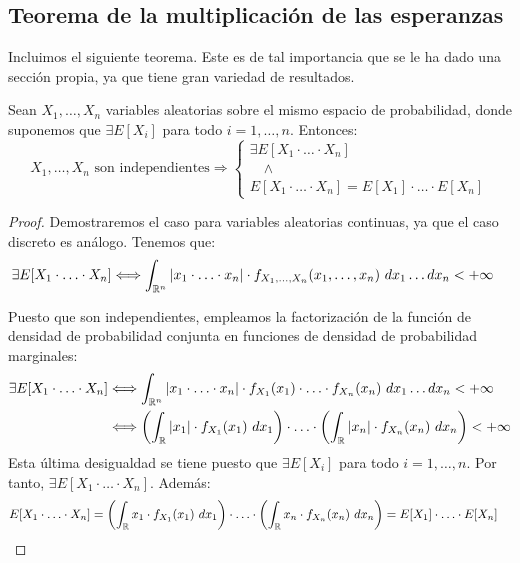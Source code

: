\subsection{Teorema de la multiplicación de las esperanzas}
Incluimos el siguiente teorema. Este es de tal importancia que se le ha dado una sección propia, ya que tiene gran variedad de resultados.
\begin{teo}
    Sean $X_1, \ldots, X_n$ variables aleatorias sobre el mismo espacio de probabilidad, donde suponemos que $\exists E[X_i]$ para todo $i = 1, \ldots, n$. Entonces:
    \begin{equation*}
        X_1, \ldots, X_n \text{ son independientes} \Longrightarrow \left\{
            \begin{array}{l}
                \exists E[X_1 \cdot \ldots \cdot X_n] \\
                \quad \land \\
                E[X_1 \cdot \ldots \cdot X_n] = E[X_1] \cdot \ldots \cdot E[X_n]
            \end{array}
        \right.
    \end{equation*}
\end{teo}
\begin{proof}
    Demostraremos el caso para variables aleatorias continuas, ya que el caso discreto es análogo. Tenemos que:
    \begin{align*}
        \exists E[X_1 \cdot \ldots \cdot X_n] &\Longleftrightarrow \int_{\mathbb{R}^n} |x_1 \cdot \ldots \cdot x_n| \cdot f_{X_1, \ldots, X_n}(x_1, \ldots, x_n) \ dx_1 \dots dx_n < +\infty
    \end{align*}

    Puesto que son independientes, empleamos la factorización de la función de densidad de probabilidad conjunta en funciones de densidad de probabilidad marginales:
    \begin{align*}
        \exists E[X_1 \cdot \ldots \cdot X_n] &\Longleftrightarrow \int_{\mathbb{R}^n} |x_1 \cdot \ldots \cdot x_n| \cdot f_{X_1}(x_1) \cdot \ldots \cdot f_{X_n}(x_n) \ dx_1 \dots dx_n < +\infty\\
        &\Longleftrightarrow \left(\int_{\mathbb{R}} |x_1| \cdot f_{X_1}(x_1) \ dx_1\right) \cdot \ldots \cdot \left(\int_{\mathbb{R}} |x_n| \cdot f_{X_n}(x_n) \ dx_n\right) < +\infty
    \end{align*}
    Esta última desigualdad se tiene puesto que $\exists E[X_i]$ para todo $i = 1, \ldots, n$. Por tanto, $\exists E[X_1 \cdot \ldots \cdot X_n]$. Además:
    \begin{align*}
        E[X_1 \cdot \ldots \cdot X_n] &= \left(\int_{\mathbb{R}} x_1 \cdot f_{X_1}(x_1) \ dx_1\right) \cdot \ldots \cdot \left(\int_{\mathbb{R}} x_n \cdot f_{X_n}(x_n) \ dx_n\right) = E[X_1] \cdot \ldots \cdot E[X_n]
    \end{align*}
\end{proof}

